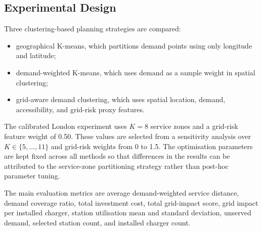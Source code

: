 \subsection{Experimental Design}
Three clustering-based planning strategies are compared:
\begin{itemize}
  \item geographical K-means, which partitions demand points using only longitude and latitude;
  \item demand-weighted K-means, which uses demand as a sample weight in spatial clustering;
  \item grid-aware demand clustering, which uses spatial location, demand, accessibility, and grid-risk proxy features.
\end{itemize}

The calibrated London experiment uses \(K=8\) service zones and a grid-risk feature weight of 0.50. These values are selected from a sensitivity analysis over \(K \in \{5,\ldots,11\}\) and grid-risk weights from 0 to 1.5. The optimisation parameters are kept fixed across all methods so that differences in the results can be attributed to the service-zone partitioning strategy rather than post-hoc parameter tuning.

The main evaluation metrics are average demand-weighted service distance, demand coverage ratio, total investment cost, total grid-impact score, grid impact per installed charger, station utilisation mean and standard deviation, unserved demand, selected station count, and installed charger count.
